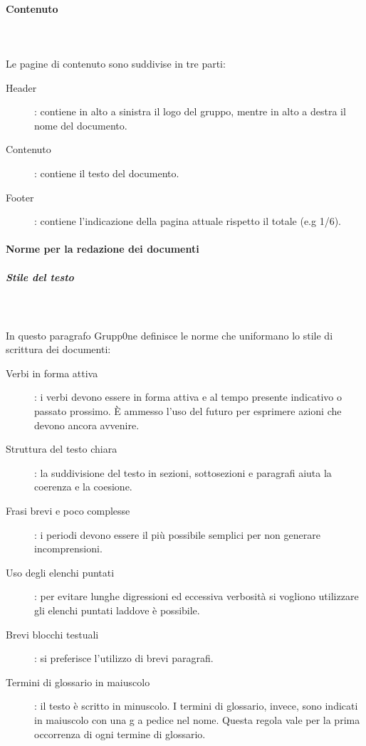 \documentclass[../norme-di-progetto.tex]{subfiles}
\begin{document}
\paragraph{Contenuto}\mbox{}\\
\label{par:contenuto}
\\Le pagine di contenuto sono suddivise in tre parti:
\begin{description}
	\item [Header]: contiene in alto a sinistra il logo del gruppo, mentre in alto a destra il nome del documento.
	\item [Contenuto]: contiene il testo del documento.
	\item [Footer]: contiene l'indicazione della pagina attuale rispetto il totale (e.g 1/6).
\end{description}
\paragraph{Norme per la redazione dei documenti}
\label{par:norme per la redazione dei documenti}
\subparagraph{Stile del testo}\mbox{}\\
\label{subp:stile del testo}
\\In questo paragrafo Grupp0ne definisce le norme che uniformano lo stile di scrittura dei documenti:
\begin{description}
		\item [Verbi in forma attiva]: i verbi devono essere in forma attiva e al tempo presente indicativo o passato prossimo. È ammesso l'uso del futuro per esprimere azioni che devono ancora avvenire.
		\item [Struttura del testo chiara]: la suddivisione del testo in sezioni, sottosezioni e paragrafi aiuta la coerenza e la coesione.
		\item [Frasi brevi e poco complesse]: i periodi devono essere il più possibile semplici per non generare incomprensioni.
		\item [Uso degli elenchi puntati]: per evitare lunghe digressioni ed eccessiva verbosità si vogliono utilizzare gli elenchi puntati laddove è possibile.
		\item [Brevi blocchi testuali]: si preferisce l'utilizzo di brevi paragrafi.
		\item [Termini di glossario in maiuscolo]: il testo è scritto in minuscolo. I termini di glossario, invece, sono indicati in maiuscolo con una g a pedice nel nome. Questa regola vale per la prima occorrenza di ogni termine di glossario.
\end{description}
\end{document}
